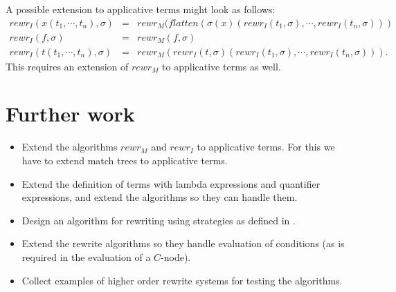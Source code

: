 \documentclass{article}
\begin{document}
A possible extension to applicative terms might look as follows:%
\begin{equation*}
\begin{array}{lll}
rewr_{I}(x(t_{1},\cdots ,t_{n}),\sigma ) & = & rewr_{M}(flatten(\sigma
(x)(rewr_{I}(t_{1},\sigma ),\cdots ,rewr_{I}(t_{n},\sigma ))) \\ 
rewr_{I}(f,\sigma ) & = & rewr_{M}(f,\sigma ) \\ 
rewr_{I}(t(t_{1},\cdots ,t_{n}),\sigma ) & = & rewr_{M}(rewr_{I}(t,\sigma
)(rewr_{I}(t_{1},\sigma ),\cdots ,rewr_{I}(t_{n},\sigma ))).%
\end{array}%
\end{equation*}%
This requires an extension of $rewr_{M}$ to applicative terms as well.

\section{Further work}

\begin{itemize}
\item Extend the algorithms $rewr_{M}$ and $rewr_{I}$ to applicative terms.
For this we have to extend match trees to applicative terms.

\item Extend the definition of terms with lambda expressions and quantifier
expressions, and extend the algorithms so they can handle them.

\item Design an algorithm for rewriting using strategies as defined in \cite%
{weerdenburg2009}.

\item Extend the rewrite algorithms so they handle evaluation of conditions
(as is required in the evaluation of a $C$-node).

\item Collect examples of higher order rewrite systems for testing the
algorithms.
\end{itemize}



\end{document}
